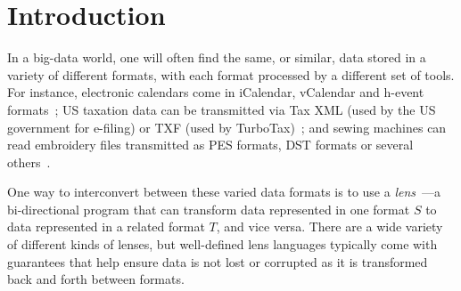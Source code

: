 \documentclass[acmsmall,screen,anonymous]{acmart}
\begin{document}
\author{Solomon Maina}

\author{Kathleen Fisher}

\author{Benjamin C. Pierce}

\author{David Walker}

\author{Steve Zdancewic}


\maketitle
\fi

\ifanon\else
\fi

\section{Introduction}

\noindent
{}

In a big-data world, one will often find the same, or similar, data stored in a
variety of different formats, with each format processed by a different set of tools.
For instance, electronic calendars come in iCalendar, vCalendar and h-event
formats~\cite{calendar-formats}; US
taxation data can be transmitted via Tax XML (used by the US government for e-filing)
or TXF (used by TurboTax)~\cite{tax-formats}; and sewing machines can read embroidery files transmitted
as PES formats, DST formats or several others~\cite{embroidery-formats}.

One way to interconvert between these varied data formats is to use a
\emph{lens}~\cite{?}---a bi-directional
program that can transform data represented in one format $S$ to data represented
in a related format $T$,
and vice versa.  There are a wide variety of different kinds of lenses, but well-defined lens
languages typically come with guarantees that help ensure data is
not lost or corrupted as it is transformed back and forth between formats.
\end{document}

